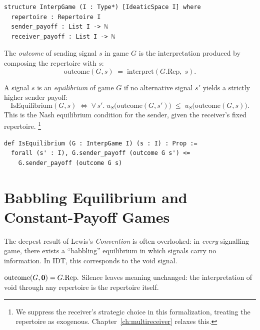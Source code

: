 \begin{lstlisting}[caption={The interpretation game structure.}]
structure InterpGame (I : Type*) [IdeaticSpace I] where
  repertoire : Repertoire I
  sender_payoff : List I -> ℕ
  receiver_payoff : List I -> ℕ
\end{lstlisting}

\begin{definition}[Outcome]
\label{def:outcome}
The \emph{outcome} of sending signal $s$ in game $G$ is the interpretation
produced by composing the repertoire with $s$:
\[
  \mathrm{outcome}(G, s) \;=\; \mathrm{interpret}(G.\mathrm{Rep},\; s).
\]
\end{definition}

\begin{definition}[Equilibrium]
\label{def:equilibrium}
A signal $s$ is an \emph{equilibrium} of game $G$ if no alternative signal
$s'$ yields a strictly higher sender payoff:
\[
  \mathrm{IsEquilibrium}(G, s) \;\iff\;
  \forall\, s'.\;
  u_S\!\bigl(\mathrm{outcome}(G, s')\bigr)
  \;\le\;
  u_S\!\bigl(\mathrm{outcome}(G, s)\bigr).
\]
This is the Nash equilibrium condition for the sender, given the receiver's
fixed repertoire.%
\footnote{We suppress the receiver's strategic choice in this formalization,
treating the repertoire as exogenous.  Chapter~\ref{ch:multireceiver}
relaxes this.}
\end{definition}

\begin{lstlisting}[caption={Equilibrium in Lean~4.}]
def IsEquilibrium (G : InterpGame I) (s : I) : Prop :=
  forall (s' : I), G.sender_payoff (outcome G s') <=
    G.sender_payoff (outcome G s)
\end{lstlisting}


\section{Babbling Equilibrium and Constant-Payoff Games}
\label{sec:eq-babbling}

The deepest result of Lewis's \emph{Convention} is often overlooked: in
\emph{every} signalling game, there exists a ``babbling'' equilibrium in
which signals carry no information.  In IDT, this corresponds to the void
signal.

\begin{theorem}
\label{thm:outcome-void}
$\mathrm{outcome}(G, \mathbf{0}) = G.\mathrm{Rep}.$
Silence leaves meaning unchanged: the interpretation of void through any
repertoire is the repertoire itself.
\end{theorem}

